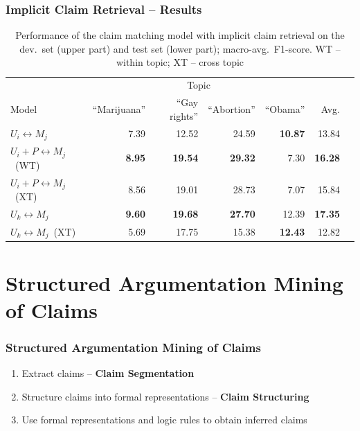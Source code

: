 \documentclass{beamer}
\begin{document}
\begin{frame}
\frametitle{Implicit Claim Retrieval -- Results}

\begin{table}
\begin{center}
{\scriptsize
\setlength{\tabcolsep}{4.8pt}
\begin{tabular}{lrrrrrr}
\toprule
&\multicolumn{4}{c}{Topic}\\
\cmidrule(lr){2-5}
Model & ``Marijuana'' & ``Gay rights''  & ``Abortion'' & ``Obama'' & Avg. \\
\midrule
$U_i \leftrightarrow M_j$ & 7.39          & 12.52        & 24.59       & {\bf 10.87} & 13.84 \\
$U_i + P \leftrightarrow M_j$\ (WT)     & {\bf 8.95}    & {\bf 19.54}  & {\bf 29.32} & 7.30        & {\bf 16.28} \\
$U_i + P \leftrightarrow M_j$ \ (XT)   & 8.56          & 19.01        & 28.73       & 7.07        & 15.84 \\
\midrule
$U_k \leftrightarrow M_j$            & {\bf 9.60}   & {\bf 19.68}   & {\bf 27.70} & 12.39       & {\bf 17.35} \\
$U_k \leftrightarrow M_j$\ (XT)  & 5.69         &  17.75        & 15.38       & {\bf 12.43} & 12.82 \\
\bottomrule
\end{tabular}}
\caption{Performance of the claim matching model with implicit claim retrieval on the
dev.~set (upper part) and test set (lower part); macro-avg.~F1-score. WT -- within topic; XT -- cross topic}
\label{tab:argpremise_retrieval}
\end{center}
\end{table}
\end{frame}

\section{Structured Argumentation Mining of Claims}

\begin{frame}
	\frametitle{Structured Argumentation Mining of Claims}

	\begin{enumerate}
		\item Extract claims -- \textbf{Claim Segmentation}
			\vspace{1cm}
		\item Structure claims into formal representations -- \textbf{Claim Structuring}
			\vspace{1cm}
		\item Use formal representations and logic rules to obtain inferred claims
	\end{enumerate}

\end{frame}
\end{document}
